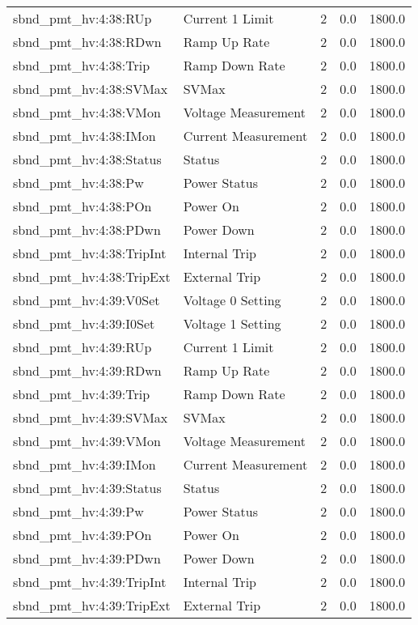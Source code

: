 \begin{center}
\begin{longtable}{l | l l l l }
sbnd\_pmt\_hv:4:38:RUp & Current 1 Limit & 2 & 0.0 & 1800.0\\ 
sbnd\_pmt\_hv:4:38:RDwn & Ramp Up Rate & 2 & 0.0 & 1800.0\\ 
sbnd\_pmt\_hv:4:38:Trip & Ramp Down Rate & 2 & 0.0 & 1800.0\\ 
sbnd\_pmt\_hv:4:38:SVMax & SVMax & 2 & 0.0 & 1800.0\\ 
sbnd\_pmt\_hv:4:38:VMon & Voltage Measurement & 2 & 0.0 & 1800.0\\ 
sbnd\_pmt\_hv:4:38:IMon & Current Measurement & 2 & 0.0 & 1800.0\\ 
sbnd\_pmt\_hv:4:38:Status & Status & 2 & 0.0 & 1800.0\\ 
sbnd\_pmt\_hv:4:38:Pw & Power Status & 2 & 0.0 & 1800.0\\ 
sbnd\_pmt\_hv:4:38:POn & Power On & 2 & 0.0 & 1800.0\\ 
sbnd\_pmt\_hv:4:38:PDwn & Power Down & 2 & 0.0 & 1800.0\\ 
sbnd\_pmt\_hv:4:38:TripInt & Internal Trip & 2 & 0.0 & 1800.0\\ 
sbnd\_pmt\_hv:4:38:TripExt & External Trip & 2 & 0.0 & 1800.0\\ 
sbnd\_pmt\_hv:4:39:V0Set & Voltage 0 Setting & 2 & 0.0 & 1800.0\\ 
sbnd\_pmt\_hv:4:39:I0Set & Voltage 1 Setting & 2 & 0.0 & 1800.0\\ 
sbnd\_pmt\_hv:4:39:RUp & Current 1 Limit & 2 & 0.0 & 1800.0\\ 
sbnd\_pmt\_hv:4:39:RDwn & Ramp Up Rate & 2 & 0.0 & 1800.0\\ 
sbnd\_pmt\_hv:4:39:Trip & Ramp Down Rate & 2 & 0.0 & 1800.0\\ 
sbnd\_pmt\_hv:4:39:SVMax & SVMax & 2 & 0.0 & 1800.0\\ 
sbnd\_pmt\_hv:4:39:VMon & Voltage Measurement & 2 & 0.0 & 1800.0\\ 
sbnd\_pmt\_hv:4:39:IMon & Current Measurement & 2 & 0.0 & 1800.0\\ 
sbnd\_pmt\_hv:4:39:Status & Status & 2 & 0.0 & 1800.0\\ 
sbnd\_pmt\_hv:4:39:Pw & Power Status & 2 & 0.0 & 1800.0\\ 
sbnd\_pmt\_hv:4:39:POn & Power On & 2 & 0.0 & 1800.0\\ 
sbnd\_pmt\_hv:4:39:PDwn & Power Down & 2 & 0.0 & 1800.0\\ 
sbnd\_pmt\_hv:4:39:TripInt & Internal Trip & 2 & 0.0 & 1800.0\\ 
sbnd\_pmt\_hv:4:39:TripExt & External Trip & 2 & 0.0 & 1800.0\\ 

\end{longtable}
\end{center}
